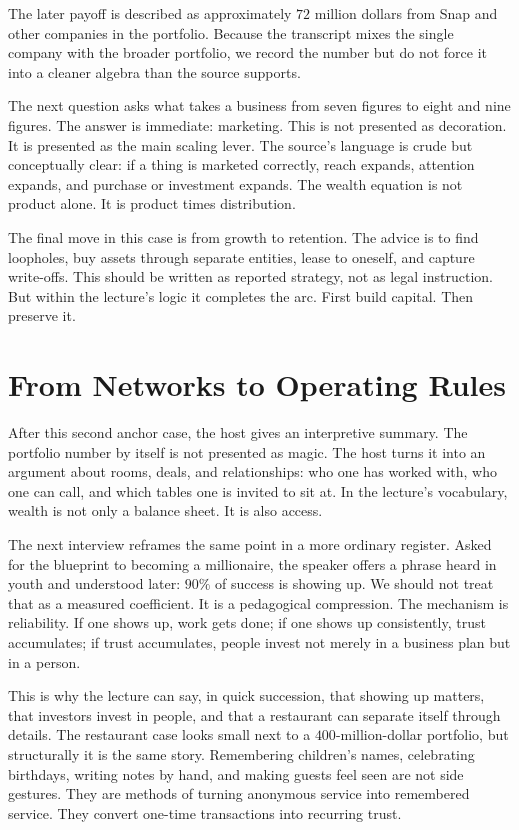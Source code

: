The later payoff is described as approximately \(72\) million dollars from Snap and other companies in the portfolio. Because the transcript mixes the single company with the broader portfolio, we record the number but do not force it into a cleaner algebra than the source supports.

The next question asks what takes a business from seven figures to eight and nine figures. The answer is immediate: marketing. This is not presented as decoration. It is presented as the main scaling lever. The source's language is crude but conceptually clear: if a thing is marketed correctly, reach expands, attention expands, and purchase or investment expands. The wealth equation is not product alone. It is product times distribution.

The final move in this case is from growth to retention. The advice is to find loopholes, buy assets through separate entities, lease to oneself, and capture write-offs. This should be written as reported strategy, not as legal instruction. But within the lecture's logic it completes the arc. First build capital. Then preserve it.

\section{From Networks to Operating Rules}

After this second anchor case, the host gives an interpretive summary. The portfolio number by itself is not presented as magic. The host turns it into an argument about rooms, deals, and relationships: who one has worked with, who one can call, and which tables one is invited to sit at. In the lecture's vocabulary, wealth is not only a balance sheet. It is also access.

The next interview reframes the same point in a more ordinary register. Asked for the blueprint to becoming a millionaire, the speaker offers a phrase heard in youth and understood later: \(90\%\) of success is showing up. We should not treat that as a measured coefficient. It is a pedagogical compression. The mechanism is reliability. If one shows up, work gets done; if one shows up consistently, trust accumulates; if trust accumulates, people invest not merely in a business plan but in a person.

This is why the lecture can say, in quick succession, that showing up matters, that investors invest in people, and that a restaurant can separate itself through details. The restaurant case looks small next to a \(400\)-million-dollar portfolio, but structurally it is the same story. Remembering children's names, celebrating birthdays, writing notes by hand, and making guests feel seen are not side gestures. They are methods of turning anonymous service into remembered service. They convert one-time transactions into recurring trust.

